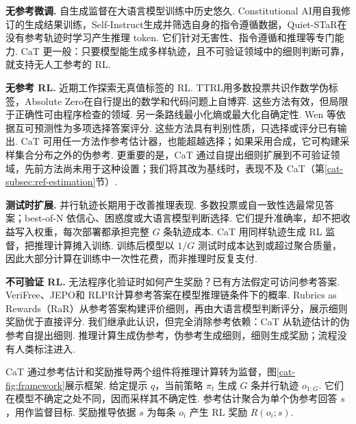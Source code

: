 \textbf{无参考微调.} 自生成监督在大语言模型训练中历史悠久. Constitutional AI\cite{cat-bai2022constitutional}用自我修订的生成结果训练，Self-Instruct\cite{cat-wang2023selfinstruct}生成并筛选自身的指令遵循数据，Quiet-STaR\cite{cat-zelikman2024quiet}在没有参考轨迹时学习产生推理 token. 它们针对无害性、指令遵循和推理等专门能力. CaT 更一般：只要模型能生成多样轨迹，且不可验证领域中的细则判断可靠，就支持无人工参考的 RL.

\textbf{无参考 RL.} 近期工作探索无真值标签的 RL. TTRL\cite{cat-zuo2025ttrl}用多数投票共识作数学伪标签，Absolute Zero\cite{cat-zhao2025absolute}在自行提出的数学和代码问题上自博弈. 这些方法有效，但局限于正确性可由程序检查的领域. 另一条路线最小化熵或最大化自确定性\cite{cat-zhao2025learning,cat-agarwal2025unreasonable,cat-prabhudesai2025maximizing,cat-gao2025one,cat-li2025confidence}. Wen 等\cite{cat-wen2025unsupervised}依据互可预测性为多项选择答案评分. 这些方法具有判别性质，只选择或评分已有输出. CaT 可用任一方法作参考估计器，也能超越选择；如果采用合成，它可构建采样集合分布之外的伪参考. 更重要的是，CaT 通过自提出细则扩展到不可验证领域，先前方法尚未用于这种设置；我们将其改为基线时，表现不及 CaT（第\ref{cat-subsec:ref-estimation}节）.

\textbf{测试时扩展.} 并行轨迹长期用于改善推理表现. 多数投票或自一致性\cite{cat-wang2023}选最常见答案；best-of-N 依信心、困惑度或大语言模型判断选择\cite{cat-zheng2023judging}. 它们提升准确率，却不把收益写入权重，每次部署都承担完整 $G$ 条轨迹成本. CaT 用同样轨迹生成 RL 监督，把推理计算摊入训练. 训练后模型以 $1/G$ 测试时成本达到或超过聚合质量，因此大部分计算在训练中一次性花费，而非推理时反复支付.

\textbf{不可验证 RL.} 无法程序化验证时如何产生奖励？已有方法假定可访问参考答案. VeriFree\cite{cat-zhou2025reinforcing}、JEPO\cite{cat-tang2025beyond}和 RLPR\cite{cat-yu2025rlpr}计算参考答案在模型推理链条件下的概率. Rubrics as Rewards（RaR）\cite{cat-gunjal2025rubrics}从参考答案构建评价细则，再由大语言模型判断评分，展示细则奖励优于直接评分. 我们继承此认识，但完全消除参考依赖：CaT 从轨迹估计的伪参考自提出细则. 推理计算生成伪参考，伪参考生成细则，细则生成奖励；流程没有人类标注进入.

CaT 通过参考估计和奖励推导两个组件将推理计算转为监督，图\ref{cat-fig:framework}展示框架. 给定提示 $q$，当前策略 $\pi_t$ 生成 $G$ 条并行轨迹 $o_{1:G}$. 它们在模型不确定之处不同，因而采样其不确定性. 参考估计聚合为单个伪参考回答 $s$，用作监督目标. 奖励推导依据 $s$ 为每条 $o_i$ 产生 RL 奖励 $R(o_i;s)$.

